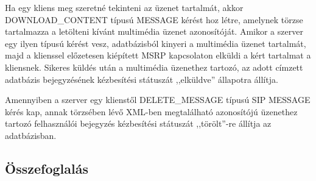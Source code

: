 Ha egy kliens meg szeretné tekinteni az üzenet tartalmát, akkor DOWNLOAD\_CONTENT típusú MESSAGE kérést hoz létre, amelynek törzse tartalmazza a letölteni kívánt multimédia üzenet azonosítóját. Amikor a szerver egy ilyen típusú kérést vesz, adatbázisból kinyeri a multimédia üzenet tartalmát, majd a klienssel előzetesen kiépített MSRP kapcsolaton elküldi a kért tartalmat a kliensnek. Sikeres küldés után a multimédia üzenethez tartozó, az adott címzett adatbázis bejegyzésének kézbesítési státuszát ,,elküldve'' állapotra állítja.

Amennyiben a szerver egy klienstől DELETE\_MESSAGE típusú SIP MESSAGE kérés kap, annak törzsében lévő XML-ben megtalálható azonosítójú üzenethez tartozó felhasználói bejegyzés kézbesítési státuszát ,,törölt''-re állítja az adatbázisban.  


\subsection{Összefoglalás}

